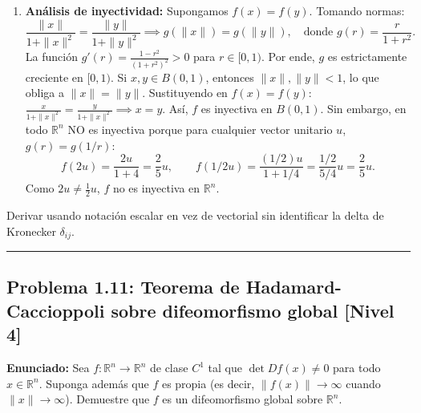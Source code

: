 \documentclass[11pt,a4paper]{article}
\begin{document}
\begin{enumerate}[label=\textbf{\arabic*.}]
\item \textbf{Análisis de inyectividad:}
Supongamos $f(x) = f(y)$. Tomando normas:
\begin{equation*}
\frac{\|x\|}{1 + \|x\|^2} = \frac{\|y\|}{1 + \|y\|^2} \implies g(\|x\|) = g(\|y\|), \quad \text{donde } g(r) = \frac{r}{1 + r^2}.
\end{equation*}
La función $g'(r) = \frac{1 - r^2}{(1 + r^2)^2} > 0$ para $r \in [0, 1)$.
Por ende, $g$ es estrictamente creciente en $[0, 1)$. Si $x, y \in B(0, 1)$, entonces $\|x\|, \|y\| < 1$, lo que obliga a $\|x\| = \|y\|$.
Sustituyendo en $f(x) = f(y)$: $\frac{x}{1+\|x\|^2} = \frac{y}{1+\|x\|^2} \implies x = y$.
Así, $f$ es inyectiva en $B(0, 1)$.
Sin embargo, en todo $\mathbb{R}^n$ NO es inyectiva porque para cualquier vector unitario $u$, $g(r) = g(1/r)$:
\begin{equation*}
f(2u) = \frac{2u}{1 + 4} = \frac{2}{5}u, \qquad f(1/2 u) = \frac{(1/2)u}{1 + 1/4} = \frac{1/2}{5/4}u = \frac{2}{5}u.
\end{equation*}
Como $2u \neq \frac{1}{2}u$, $f$ no es inyectiva en $\mathbb{R}^n$.
\end{enumerate}

\begin{trapbox}
Derivar usando notación escalar en vez de vectorial sin identificar la delta de Kronecker $\delta_{ij}$.
\end{trapbox}

\vspace{0.5cm}
\hrule
\vspace{0.5cm}

\subsection*{Problema 1.11: Teorema de Hadamard-Caccioppoli sobre difeomorfismo global \hfill \color{primaryblue}\small[Nivel 4]}

\begin{tcolorbox}[colback=white,colframe=gray!40,arc=1mm,boxrule=0.5pt,left=3mm,right=3mm,top=2mm,bottom=2mm]
\textbf{Enunciado:} Sea $f: \mathbb{R}^n \to \mathbb{R}^n$ de clase $C^1$ tal que $\det Df(x) \neq 0$ para todo $x \in \mathbb{R}^n$. Suponga además que $f$ es propia (es decir, $\|f(x)\| \to \infty$ cuando $\|x\| \to \infty$). Demuestre que $f$ es un difeomorfismo global sobre $\mathbb{R}^n$.
\end{tcolorbox}
\end{document}
